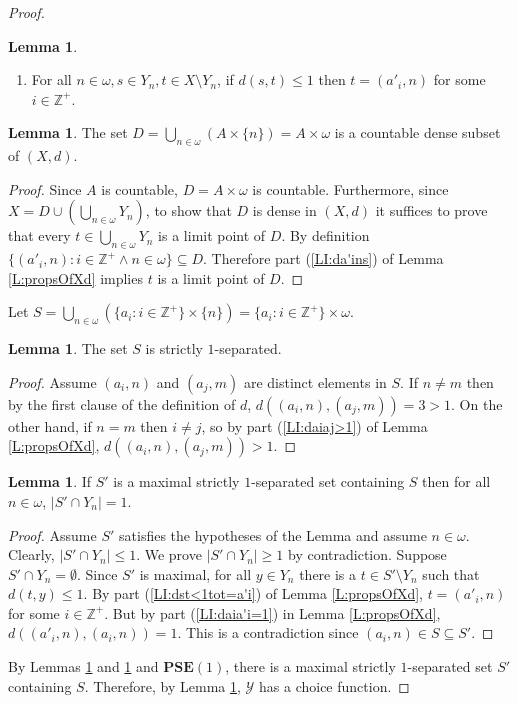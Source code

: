 \documentclass[11pt, reqno]{amsart}
\theoremstyle{definition}
\numberwithin{theorem}{section}
\theoremstyle{definition}
\theoremstyle{definition}
\newtheorem{lemma}[theorem]{Lemma}
\theoremstyle{definition}
\theoremstyle{definition}
\theoremstyle{definition}
\numberwithin{claim}{section}
\theoremstyle{definition}
\theoremstyle{definition}
\theoremstyle{definition}
\theoremstyle{definition}
\theoremstyle{definition}
\theoremstyle{remboldstyle}
\begin{document}
\begin{proof}
\begin{lemma}
\begin{enumerate}
\item \label{LI:dst<1tot=a'i} For all $n \in \omega, s \in Y_n, t \in X \setminus Y_n$, if $d(s,t) \leq 1$ then $t = (a'_i,n)$ for some $i \in \mathbb{Z}^+$. %
\end{enumerate}
\end{lemma}
\begin{lemma} \label{L:Ddense}
The set $D = \bigcup_{n \in \omega} (A \times \{ n \}) = A \times \omega$ is a countable dense subset of $(X,d)$.
\end{lemma}
\begin{proof}
Since $A$ is countable, $D = A \times \omega$ is countable. Furthermore, since $X = D \cup \left( \bigcup_{n \in \omega} Y_n \right)$, to show that $D$ is dense in $(X,d)$ it suffices to prove that every $t \in \bigcup_{n \in \omega} Y_n$ is a limit point of $D$.  By definition $\{ (a'_i,n)  : i \in \mathbb{Z}^+ \land n \in \omega \} \subseteq D$.  Therefore part (\ref{LI:da'ins}) of Lemma \ref{L:propsOfXd} implies $t$ is a limit point of $D$.
\end{proof}
Let $S = \bigcup_{n \in \omega} \left( \{a_i : i \in \mathbb{Z}^+ \} \times \{ n \} \right) = \{a_i : i \in \mathbb{Z}^+ \} \times \omega$. 
\begin{lemma} \label{L:SoneSeparated}
The set $S$ is strictly $1$-separated.
\end{lemma}
\begin{proof}
Assume $(a_i,n)$ and $(a_j,m)$ are distinct elements in $S$.  If $n \ne m$ then by the first clause of the definition of $d$, $d((a_i,n),(a_j,m)) = 3 > 1$.  On the other hand, if $n = m$ then $i \ne j$, so by part (\ref{LI:daiaj>1}) of Lemma \ref{L:propsOfXd}, $d((a_i,n),(a_j,m)) > 1$.
\end{proof}
\begin{lemma} \label{L:SextGivesCF}
If $S'$ is a maximal strictly $1$-separated set containing $S$ then for all $n \in \omega$, $|S' \cap Y_n| = 1$.
\end{lemma}
\begin{proof}
Assume $S'$ satisfies the hypotheses of the Lemma and assume $n \in \omega$.  Clearly, $|S' \cap Y_n| \le 1$.  We prove $|S' \cap Y_n| \ge 1$ by contradiction. Suppose $S' \cap Y_n = \emptyset$.  Since $S'$ is maximal, for all $y \in Y_n$ there is a $t \in S' \setminus Y_n$ such that $d(t,y) \le 1$. By part (\ref{LI:dst<1tot=a'i}) of Lemma \ref{L:propsOfXd},  $t = (a'_i,n)$ for some $i \in \mathbb{Z}^+$.  But by part (\ref{LI:daia'i=1}) in Lemma \ref{L:propsOfXd}, $d((a'_i,n), (a_i,n)) = 1$.  This is a contradiction since $(a_i,n) \in S \subseteq S'$.
\end{proof}
By Lemmas \ref{L:Ddense} and \ref{L:SoneSeparated} and $\mathbf{PSE}(1)$, there is a maximal strictly $1$-separated set $S'$ containing $S$.  Therefore, by Lemma \ref{L:SextGivesCF}, $\mathcal{Y}$ has a choice function.
\end{proof}
\end{document}
